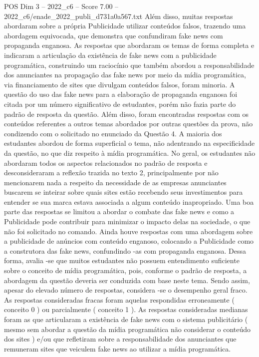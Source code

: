 \begin{textsample}{POS Dim 3 – 2022\_c6 – Score 7.00 – 2022\_c6/enade\_2022\_publi\_d731a0a567.txt}
Além disso, muitas respostas abordaram sobre a própria Publicidade utilizar conteúdos falsos, trazendo uma abordagem equivocada, que demonstra que confundiram fake news com propaganda enganosa.
As respostas que abordaram os temas de forma completa e indicaram a articulação da existência de fake news com a publicidade programática, construindo um raciocínio que também abordou a responsabilidade dos anunciantes na propagação das fake news por meio da mídia programática, via financiamento de sites que divulgam conteúdos falsos, foram minoria.
A questão do uso das fake news para a elaboração de propaganda enganosa foi citada por um número significativo de estudantes, porém não fazia parte do padrão de resposta da questão.
Além disso, foram encontradas respostas com os conteúdos referentes a outros temas abordados por outras questões da prova, não condizendo com o solicitado no enunciado da Questão 4.
A maioria dos estudantes abordou de forma superficial o tema, não adentrando na especificidade da questão, no que diz respeito à mídia programática.
No geral, os estudantes não abordaram todos os aspectos relacionados no padrão de resposta e desconsideraram a reflexão trazida no texto 2, principalmente por não mencionarem nada a respeito da necessidade de as empresas anunciantes buscarem se inteirar sobre quais sites estão recebendo seus investimentos para entender se sua marca estava associada a algum conteúdo inapropriado.
Uma boa parte das respostas se limitou a abordar o combate das fake news e como a Publicidade pode contribuir para minimizar o impacto delas na sociedade, o que não foi solicitado no comando.
Ainda houve respostas com uma abordagem sobre a publicidade de anúncios com conteúdo enganoso, colocando a Publicidade como a construtora das fake news, confundindo -as com propaganda enganosa.
Dessa forma, avalia -se que muitos estudantes não possuem entendimento suficiente sobre o conceito de mídia programática, pois, conforme o padrão de resposta, a abordagem da questão deveria ser conduzida com base neste tema.
Sendo assim, apesar do elevado número de respostas, considera -se o desempenho geral fraco.
As respostas consideradas fracas foram aquelas respondidas erroneamente ( conceito 0 ) ou parcialmente ( conceito 1 ).
As respostas consideradas medianas foram as que articularam a existência de fake news com o sistema publicitário ( mesmo sem abordar a questão da mídia programática não considerar o conteúdo dos sites ) e/ou que refletiram sobre a responsabilidade dos anunciantes que remuneram sites que veiculem fake news ao utilizar a mídia programática.

\end{textsample}
